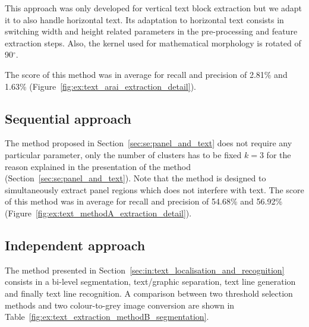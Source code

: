 This approach was only developed for vertical text block extraction but we adapt it to also handle horizontal text.
Its adaptation to horizontal text consists in switching width and height related parameters in the pre-processing and feature extraction steps.
Also, the kernel used for mathematical morphology is rotated of 90$^{\circ}$.

The score of this method was in average for recall and precision of 2.81\% and 1.63\% (Figure~\ref{fig:ex:text_arai_extraction_detail}).

\subsection{Sequential approach} %
The method proposed in Section~\ref{sec:se:panel_and_text} does not require any particular parameter, only the number of clusters has to be fixed $k=3$ for the reason explained in the presentation of the method (Section~\ref{sec:se:panel_and_text}).
Note that the method is designed to simultaneously extract panel regions which does not interfere with text.
The score of this method  was in average for recall and precision of 54.68\% and 56.92\% (Figure~\ref{fig:ex:text_methodA_extraction_detail}).



\subsection{Independent approach} %
\label{sub:ex:text_extraction_evaluation_method_b}

The method presented in Section~\ref{sec:in:text_localisation_and_recognition} consists in a bi-level segmentation, text/graphic separation, text line generation and finally text line recognition.
A comparison between two threshold selection methods and two colour-to-grey image conversion are shown in Table~\ref{fig:ex:text_extraction_methodB_segmentation}.


